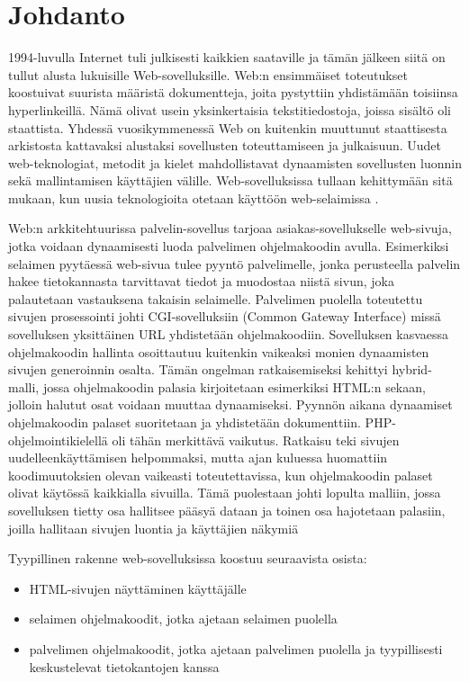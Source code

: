 \documentclass[utf8]{gradu3}
\begin{document}
\mainmatter

\chapter{Johdanto}

1994-luvulla Internet tuli julkisesti kaikkien saataville ja tämän jälkeen siitä on tullut alusta lukuisille Web-sovelluksille. Web:n ensimmäiset toteutukset koostuivat suurista määristä dokumentteja, joita pystyttiin
yhdistämään toisiinsa hyperlinkeillä. Nämä olivat usein yksinkertaisia tekstitiedostoja, joissa sisältö oli staattista. Yhdessä vuosikymmenessä Web on kuitenkin muuttunut staattisesta arkistosta kattavaksi alustaksi sovellusten toteuttamiseen ja julkaisuun.  Uudet web-teknologiat, metodit ja kielet mahdollistavat dynaamisten sovellusten luonnin sekä mallintamisen käyttäjien välille. Web-sovelluksissa tullaan kehittymään sitä mukaan, kun uusia teknologioita otetaan käyttöön web-selaimissa \parencite{trends}. 

Web:n arkkitehtuurissa palvelin-sovellus tarjoaa asiakas-sovellukselle web-sivuja, jotka voidaan dynaamisesti luoda palvelimen ohjelmakoodin avulla. Esimerkiksi selaimen pyytäessä web-sivua tulee pyyntö palvelimelle, jonka perusteella palvelin hakee tietokannasta tarvittavat tiedot ja muodostaa niistä sivun, joka palautetaan vastauksena takaisin selaimelle. Palvelimen puolella toteutettu sivujen prosessointi johti CGI-sovelluksiin (Common Gateway Interface) missä sovelluksen yksittäinen URL yhdistetään ohjelmakoodiin. Sovelluksen kasvaessa ohjelmakoodin hallinta osoittautuu kuitenkin vaikeaksi monien dynaamisten sivujen generoinnin osalta. Tämän ongelman ratkaisemiseksi kehittyi hybrid-malli, jossa ohjelmakoodin palasia kirjoitetaan esimerkiksi HTML:n sekaan, jolloin halutut osat voidaan muuttaa dynaamiseksi. Pyynnön aikana dynaamiset ohjelmakoodin palaset suoritetaan ja yhdistetään dokumenttiin. PHP-ohjelmointikielellä oli tähän merkittävä vaikutus. Ratkaisu teki sivujen uudelleenkäyttämisen helpommaksi, mutta ajan kuluessa huomattiin koodimuutoksien olevan vaikeasti toteutettavissa, kun ohjelmakoodin palaset olivat käytössä kaikkialla sivuilla. Tämä puolestaan johti lopulta malliin, jossa sovelluksen tietty osa hallitsee pääsyä dataan ja toinen osa hajotetaan palasiin, joilla hallitaan sivujen luontia ja käyttäjien näkymiä \parencite[3.1]{trends}

Tyypillinen rakenne web-sovelluksissa koostuu seuraavista osista: 
\begin{itemize}
\item HTML-sivujen näyttäminen käyttäjälle
\item selaimen ohjelmakoodit, jotka ajetaan selaimen puolella
\item palvelimen ohjelmakoodit, jotka ajetaan palvelimen puolella ja tyypillisesti keskustelevat tietokantojen kanssa
\end{itemize}
\end{document}
